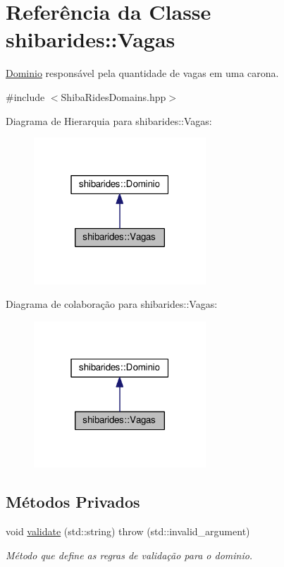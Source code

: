 \hypertarget{classshibarides_1_1Vagas}{}\section{Referência da Classe shibarides\+:\+:Vagas}
\label{classshibarides_1_1Vagas}


\hyperlink{classshibarides_1_1Dominio}{Dominio} responsável pela quantidade de vagas em uma carona.  




{\ttfamily \#include $<$Shiba\+Rides\+Domains.\+hpp$>$}



Diagrama de Hierarquia para shibarides\+:\+:Vagas\+:\nopagebreak
\begin{figure}[H]
\begin{center}
\leavevmode
\includegraphics[width=183pt]{classshibarides_1_1Vagas__inherit__graph}
\end{center}
\end{figure}


Diagrama de colaboração para shibarides\+:\+:Vagas\+:\nopagebreak
\begin{figure}[H]
\begin{center}
\leavevmode
\includegraphics[width=183pt]{classshibarides_1_1Vagas__coll__graph}
\end{center}
\end{figure}
\subsection*{Métodos Privados}
\begin{DoxyCompactItemize}
\item 
void \hyperlink{classshibarides_1_1Vagas_ae5f73c52819397524b0334d9e609d296}{validate} (std\+::string)  throw (std\+::invalid\+\_\+argument)
\begin{DoxyCompactList}\small\item\em Método que define as regras de validação para o dominio. \end{DoxyCompactList}\end{DoxyCompactItemize}
